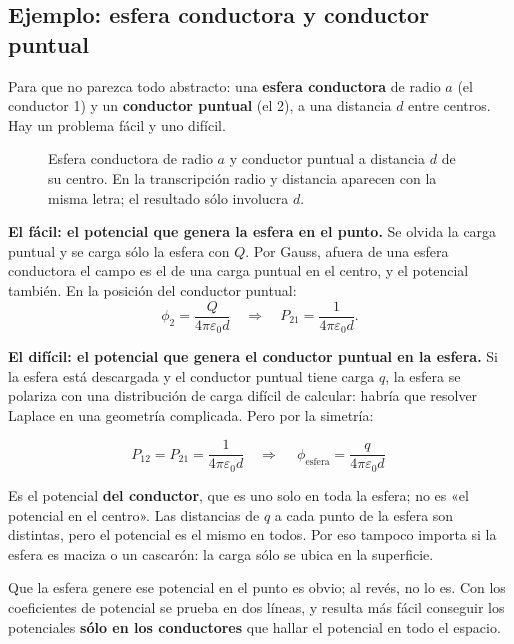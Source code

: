 \documentclass[12pt,a4paper]{article}
\begin{document}
\subsection{Ejemplo: esfera conductora y conductor puntual}

Para que no parezca todo abstracto: una \textbf{esfera conductora} de radio $a$
(el conductor 1) y un \textbf{conductor puntual} (el 2), a una distancia $d$
entre centros. Hay un problema fácil y uno difícil.

\begin{figure}[H]
  \centering
  
  \caption{Esfera conductora de radio $a$ y conductor puntual a distancia $d$ de
  su centro. En la transcripción radio y distancia aparecen con la misma letra;
  el resultado sólo involucra $d$.}
\end{figure}

\textbf{El fácil: el potencial que genera la esfera en el punto.} Se olvida la
carga puntual y se carga sólo la esfera con $Q$. Por Gauss, afuera de una esfera
conductora el campo es el de una carga puntual en el centro, y el potencial
también. En la posición del conductor puntual:
\[
\phi_2 = \frac{Q}{4\pi\varepsilon_0 d}
\quad\Longrightarrow\quad
P_{21} = \frac{1}{4\pi\varepsilon_0 d}.
\]

\textbf{El difícil: el potencial que genera el conductor puntual en la esfera.} Si
la esfera está descargada y el conductor puntual tiene carga $q$, la esfera se
polariza con una distribución de carga difícil de calcular: habría que resolver
Laplace en una geometría complicada. Pero por la simetría:

\begin{keybox}
\[
P_{12} = P_{21} = \frac{1}{4\pi\varepsilon_0 d}
\quad\Longrightarrow\quad
\boxed{\ \phi_{\text{esfera}} = \frac{q}{4\pi\varepsilon_0 d}\ }
\]
\end{keybox}

\begin{warnbox}
Es el potencial \textbf{del conductor}, que es uno solo en toda la esfera; no es
«el potencial en el centro». Las distancias de $q$ a cada punto de la esfera son
distintas, pero el potencial es el mismo en todos. Por eso tampoco importa si la
esfera es maciza o un cascarón: la carga sólo se ubica en la superficie.
\end{warnbox}

\begin{notebox}
Que la esfera genere ese potencial en el punto es obvio; al revés, no lo es. Con
los coeficientes de potencial se prueba en dos líneas, y resulta más fácil
conseguir los potenciales \textbf{sólo en los conductores} que hallar el potencial
en todo el espacio.
\end{notebox}
\end{document}
